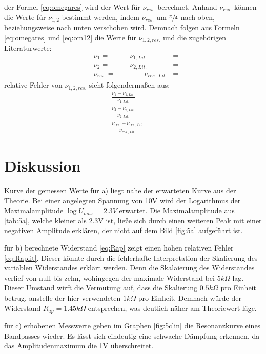   \justifying der Formel \eqref{eq:omegares} wird der Wert für $\nu_{res.}$ berechnet. Anhand $\nu_{res.}$
  können die Werte für $\nu_{1,2}$ bestimmt werden, indem $\nu_{res.}$ um $\sfrac{\pi}{4}$ nach oben, beziehungsweise nach unten 
  verschoben wird. Demnach folgen aus Formeln \eqref{eq:omegares} und \eqref{eq:om12} die Werte für $\nu_{1,2,res.}$ und die
  zugehörigen Literaturwerte:
  \begin{subequations}
  \begin{align}
    &\nu_1 = \text{} \qquad &\nu_{1,Lit.} &= \text{}\\
    &\nu_2 = \text{} \qquad &\nu_{2,Lit.} &= \text{}\\
    &\nu_{res.} = \text{} &\qquad \nu_{res.,Lit.} &= \text{}
  \end{align}
  \end{subequations}
  \justifying relative Fehler von $\nu_{1,2,res.}$ sieht folgendermaßen aus:
  \begin{subequations}
  \begin{align}
    \frac{\nu_1 - \nu_{1,Lit.}}{\nu_{1,Lit.}} &= \text{}\\
    \frac{\nu_2 - \nu_{2,Lit.}}{\nu_{2,Lit.}} &= \text{}\\
    \frac{\nu_{res.} - \nu_{res.,Lit.}}{\nu_{res.,Lit.}} &= \text{}
  \end{align} 
  \end{subequations}


\section{Diskussion}\justifying

\justifying Kurve der gemessen Werte für a) liegt nahe der erwarteten Kurve aus der Theorie. Bei einer angelegten 
Spannung von 10V wird der Logarithmus der Maximalamplitude $\log{U_{max}} = 2.3V$ erwartet. Die Maximalamplitude aus \ref{tab:5a}, 
welche kleiner als 2.3V ist, ließe sich durch einen weiteren Peak mit einer negativen Amplitude erklären, der nicht auf dem Bild 
\ref{fig:5a} aufgeführt ist. 

\justifying für b) berechnete Widerstand \eqref{eq:Rap} zeigt einen hohen relativen Fehler \eqref{eq:Raplit}. 
Dieser könnte durch die fehlerhafte Interpretation der Skalierung des variablen Widerstandes erklärt werden. Denn die Skalaierung 
des Widerstandes verlief von null bis zehn, wohingegen der maximale Widerstand bei $5k\Omega$ lag. Dieser Umstand wirft die 
Vermutung auf, dass die Skalierung $0.5k\Omega$ pro Einheit betrug, anstelle der hier verwendeten $1k\Omega$ pro Einheit. Demnach 
würde der Widerstand $R_{ap} = 1.45k\Omega$ entsprechen, was deutlich näher am Theoriewert läge.

\justifying für c) erhobenen Messwerte geben im Graphen \ref{fig:5clin} die Resonanzkurve eines Bandpasses wieder. 
Es lässt sich eindeutig eine schwache Dämpfung erkennen, da das Amplitudenmaximum die 1V überschreitet. 

\newpage
\nocite{V354}
\nocite{V353}
\printbibliography





